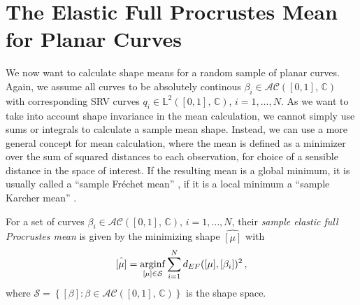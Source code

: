 \section{The Elastic Full Procrustes Mean for Planar Curves}
\label{sec:2-mean}
We now want to calculate shape means for a random sample of planar curves.
Again, we assume all curves to be absolutely continous $\beta_i \in \mathcal{AC}([0,1],\, \mathbb{C})$ with corresponding SRV curves $q_i \in \mathbb{L}^2([0,1],\, \mathbb{C})$, $i=1,\dots,N$.
As we want to take into account shape invariance in the mean calculation, we cannot simply use sums or integrals to calculate a sample mean shape.
Instead, we can use a more general concept for mean calculation, where the mean is defined as a minimizer over the sum of squared distances to each observation, for choice of a sensible distance in the space of interest.
If the resulting mean is a global minimum, it is usually called a \enquote{sample Fr\'echet mean} \parencite{Frechet1948}, if it is a local minimum a \enquote{sample Karcher mean} \parencite{Karcher1977} \parencite[see][111]{DrydenMardia2016}.

\begin{definition}
  \label{def:mean}
  For a set of curves $\beta_i \in \mathcal{AC}([0,1],\, \mathbb{C})$, $i = 1,\dots,N$,  their \emph{sample elastic full Procrustes mean} is given by the minimizing shape $\hat{[\mu]}$ with
  $$ \hat{[\mu]} = \operatorname*{arginf}_{[\mu] \in \mathcal{S}} \sum_{i=1}^N d_{EF}([\mu], [\beta_i])^2\,,$$
  where $\mathcal{S} = \left\{ [\beta] : \beta \in \mathcal{AC}([0,1],\,\mathbb{C}) \right\}$ is the shape space.
\end{definition}

